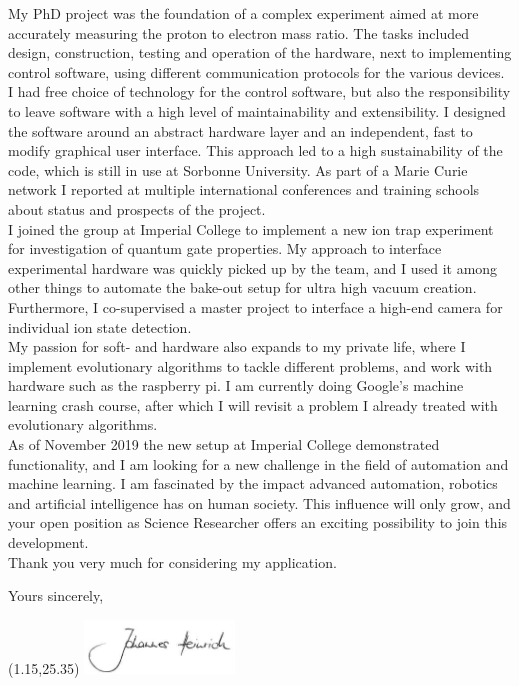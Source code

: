 \documentclass[10pt, a4paper]{class_cover_letter}
\begin{document}
My PhD project was the foundation of a complex experiment aimed at more accurately measuring the proton to electron mass ratio. The tasks included design, construction, testing and operation of the hardware, next to implementing control software, using different communication protocols for the various devices. I had free choice of technology for the control software, but also the responsibility to leave software with a high level of maintainability and extensibility. I designed the software around an abstract hardware layer and an independent, fast to modify graphical user interface. This approach led to a high sustainability of the code, which is still in use at Sorbonne University. As part of a Marie Curie network I reported at multiple international conferences and training schools about status and prospects of the project.\\

I joined the group at Imperial College to implement a new ion trap experiment for investigation of quantum gate properties. My approach to interface experimental hardware was quickly picked up by the team, and I used it among other things to automate the bake-out setup for ultra high vacuum creation. Furthermore, I co-supervised a master project to interface a high-end camera for individual ion state detection.\\

My passion for soft- and hardware also expands to my private life, where I implement evolutionary algorithms to tackle different problems, and work with hardware such as the raspberry pi. I am currently doing Google's machine learning crash course, after which I will revisit a problem I already treated with evolutionary algorithms.\\

As of November 2019 the new setup at Imperial College demonstrated functionality, and I am looking for a new challenge in the field of automation and machine learning. I am fascinated by the impact advanced automation, robotics and artificial intelligence has on human society. This influence will only grow, and your open position as Science Researcher offers an exciting possibility to join this development.\\

Thank you very much for considering my application.

\vspace{0.7cm}
Yours sincerely,

\begin{textblock}{10}(1.15,25.35)
\includegraphics[width=4cm]{unterschrift.png}
\end{textblock}
\end{document}
